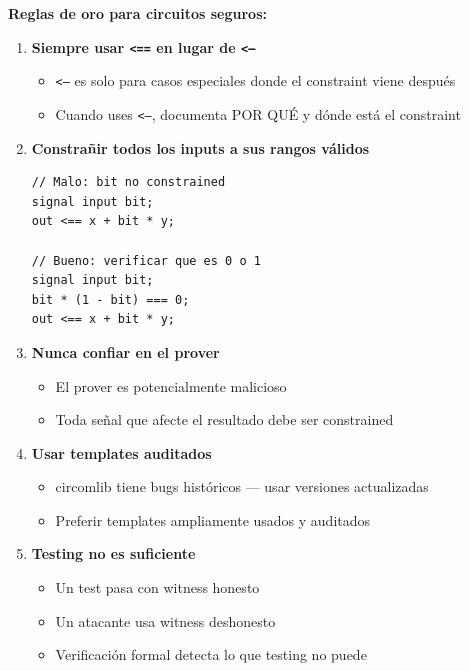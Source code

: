\documentclass[11pt,a4paper,twoside]{book}
\begin{document}
\begin{keyidea}
\textbf{Reglas de oro para circuitos seguros:}

\begin{enumerate}
    \item \textbf{Siempre usar \texttt{<==} en lugar de \texttt{<--}}
    \begin{itemize}
        \item \texttt{<--} es solo para casos especiales donde el constraint viene despu\'es
        \item Cuando uses \texttt{<--}, documenta POR QU\'E y d\'onde est\'a el constraint
    \end{itemize}
    
    \item \textbf{Constra\~nir todos los inputs a sus rangos v\'alidos}
    \begin{verbatim}
// Malo: bit no constrained
signal input bit;
out <== x + bit * y;

// Bueno: verificar que es 0 o 1
signal input bit;
bit * (1 - bit) === 0;
out <== x + bit * y;
    \end{verbatim}
    
    \item \textbf{Nunca confiar en el prover}
    \begin{itemize}
        \item El prover es potencialmente malicioso
        \item Toda se\~nal que afecte el resultado debe ser constrained
    \end{itemize}
    
    \item \textbf{Usar templates auditados}
    \begin{itemize}
        \item circomlib tiene bugs hist\'oricos --- usar versiones actualizadas
        \item Preferir templates ampliamente usados y auditados
    \end{itemize}
    
    \item \textbf{Testing no es suficiente}
    \begin{itemize}
        \item Un test pasa con witness honesto
        \item Un atacante usa witness deshonesto
        \item Verificaci\'on formal detecta lo que testing no puede
    \end{itemize}
\end{enumerate}
\end{keyidea}
\end{document}
